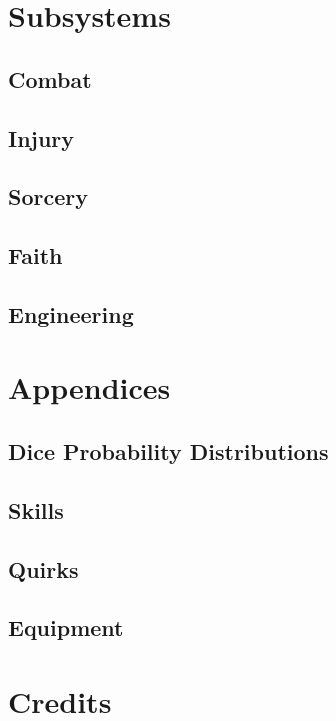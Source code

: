     \part{Subsystems}
    \renewcommand{\hsubtitle}{Change Through Purpose.}

    \chapter{Combat}
    \renewcommand{\hsubtitle}{Violence is an Option.}
    
    \chapter{Injury}
    \renewcommand{\hsubtitle}{Violence was not the Move.}

    \chapter{Sorcery}
    \renewcommand{\hsubtitle}{Magic is an Option.}

    \chapter{Faith}
    \renewcommand{\hsubtitle}{I Pray you Choose Wisely.}

    \chapter{Engineering}
    \renewcommand{\hsubtitle}{We'll build a Bomb.}

    \renewcommand{\hsubtitle}{Change Through Purpose.}
    \part{Appendices}
    \begin{appendices}
        \chapter{Dice Probability Distributions}

        \chapter{Skills}

        \chapter{Quirks}

        \chapter{Equipment}

    \end{appendices}

    \part{Credits}
    \renewcommand{\hsubtitle}{Thank You.}
    


